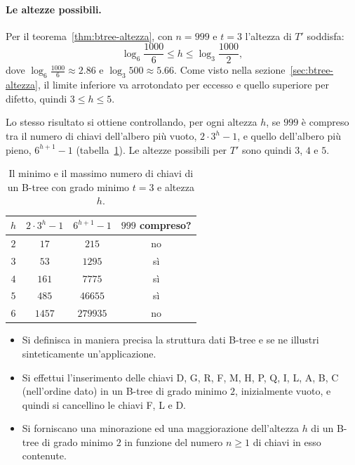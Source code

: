 \paragraph{Le altezze possibili.}
Per il teorema~\ref{thm:btree-altezza}, con $n = 999$ e $t = 3$ l'altezza di $T'$ soddisfa:
\[
\log_6 \frac{1000}{6} \le h \le \log_3 \frac{1000}{2},
\]
dove $\log_6 \frac{1000}{6} \approx 2.86$ e $\log_3 500 \approx 5.66$. Come visto nella sezione~\ref{sec:btree-altezza}, il limite inferiore va arrotondato per eccesso e quello superiore per difetto, quindi $3 \le h \le 5$.

Lo stesso risultato si ottiene controllando, per ogni altezza $h$, se $999$ è compreso tra il numero di chiavi dell'albero più vuoto, $2 \cdot 3^h - 1$, e quello dell'albero più pieno, $6^{h+1} - 1$ (tabella~\ref{tab:es-btree20-altezze}). Le altezze possibili per $T'$ sono quindi $3$, $4$ e $5$.

\begin{table}[htbp]
\centering
\small
\begin{tabular}{cccc}
\toprule
$h$ & $2 \cdot 3^h - 1$ & $6^{h+1} - 1$ & $999$ compreso? \\
\midrule
$2$ & $17$ & $215$ & no \\
$3$ & $53$ & $1295$ & sì \\
$4$ & $161$ & $7775$ & sì \\
$5$ & $485$ & $46655$ & sì \\
$6$ & $1457$ & $279935$ & no \\
\bottomrule
\end{tabular}
\caption{Il minimo e il massimo numero di chiavi di un B-tree con grado minimo $t = 3$ e altezza $h$.}
\label{tab:es-btree20-altezze}
\end{table}

\begin{esercizio}\label{es:btree-2021-09}
\begin{itemize}
    \item[(a)] Si definisca in maniera precisa la struttura dati B-tree e se ne illustri sinteticamente un'applicazione.
    \item[(b)] Si effettui l'inserimento delle chiavi D, G, R, F, M, H, P, Q, I, L, A, B, C (nell'ordine dato) in un B-tree di grado minimo $2$, inizialmente vuoto, e quindi si cancellino le chiavi F, L e D.
    \item[(c)] Si forniscano una minorazione ed una maggiorazione dell'altezza $h$ di un B-tree di grado minimo $2$ in funzione del numero $n \ge 1$ di chiavi in esso contenute.
\end{itemize}
\end{esercizio}

